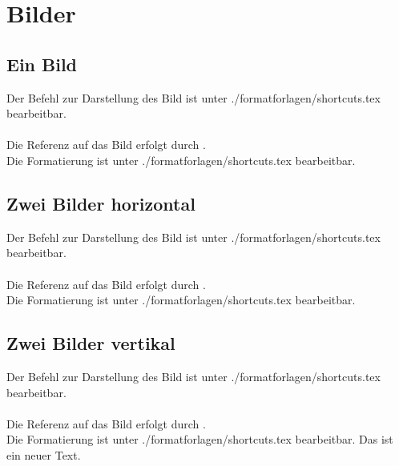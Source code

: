 %
\section{Bilder}\label{sec:bilder}
%
%
\subsection{Ein Bild}\label{subsec:ein_bild}
%

%
Der Befehl zur Darstellung des Bild ist unter ./formatforlagen/shortcuts.tex bearbeitbar.\\\\
%
Die Referenz auf das Bild erfolgt durch .\\
Die Formatierung ist unter ./formatforlagen/shortcuts.tex bearbeitbar.
%
\newpage
%
%
\subsection{Zwei Bilder horizontal}\label{subsec:zwei_bilder_hor}
%

%
Der Befehl zur Darstellung des Bild ist unter ./formatforlagen/shortcuts.tex bearbeitbar.\\\\
%
Die Referenz auf das Bild erfolgt durch .\\
Die Formatierung ist unter ./formatforlagen/shortcuts.tex bearbeitbar.
%
\newpage
%
%
\subsection{Zwei Bilder vertikal}\label{subsec:zwei_bilder_ver}
%

%
Der Befehl zur Darstellung des Bild ist unter ./formatforlagen/shortcuts.tex bearbeitbar.\\\\
%
Die Referenz auf das Bild erfolgt durch .\\
Die Formatierung ist unter ./formatforlagen/shortcuts.tex bearbeitbar.
Das ist ein neuer Text.
%
\newpage
%

